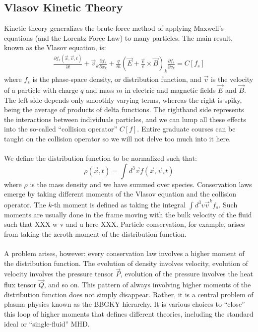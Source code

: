 
\subsection{Vlasov Kinetic Theory} \label{ssec:vlasov}
Kinetic theory generalizes the brute-force method of applying Maxwell's equations (and the Lorentz Force Law) to many particles. The main result, known as the Vlasov equation, is:
\begin{align}
  \frac{\partial f_s(\vec x,\vec v,t)}{\partial t}+\vec v_k\frac{\partial f_s}{\partial x_k}+\frac qm (\vec E+\frac{\vec v}{c}\times\vec B)_k\frac{\partial f_s}{\partial v_k}=C[f_s] \label{eq:vlasov}
\end{align}
where $f_s$ is the phase-space density, or distribution function, and $\vec v$ is the velocity of a particle with charge $q$ and mass $m$ in electric and magnetic fields $\vec E$ and $\vec B$. The left side depends only smoothly-varying terms, whereas the right is spiky, being the average of products of delta functions. The righthand side represents the interactions between individuals particles, and we can lump all these effects into the so-called ``collision operator'' $C[f]$. Entire graduate courses can be taught on the collision operator so we will not delve too much into it here.\\
\\
We define the distribution function to be normalized such that:
\begin{equation}
  \rho(\vec x,t)=\int d^3\vec v f(\vec x,\vec v, t)\label{eq:nnorm}
\end{equation}
where $\rho$ is the mass density and we have summed over species. Conservation laws emerge by taking different moments of the Vlasov equation and the collision operator. The $k$-th moment is defined as taking the integral $\int d^3v \vec v^k f_s$. Such moments are usually done in the frame moving with the bulk velocity of the fluid such that XXX w v and u here XXX. Particle conservation, for example, arises from taking the zeroth-moment of the distribution function. \\
\\
A problem arises, however: every conservation law involves a higher moment of the distribution function. The evolution of density involves velocity, evolution of velocity involves the pressure tensor $\vec P$, evolution of the pressure involves the heat flux tensor $\vec Q$, and so on. This pattern of always involving higher moments of the distribution function does not simply disappear. Rather, it is a central problem of plasma physics known as the BBGKY hierarchy. It is various choices to ``close'' this loop of higher moments that defines different theories, including the standard ideal or ``single-fluid'' MHD. \\
